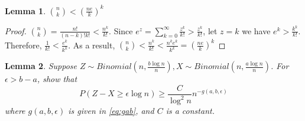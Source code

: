 \documentclass{article}
\newtheorem{lemma}{Lemma}
\begin{document}
\begin{lemma}\label{lem:nk}
	$\binom{n}{k} < (\frac{ne}{k})^k$
\end{lemma}
\begin{proof}
	$\binom{n}{k} = \frac{n!}{(n-k)!k!} < \frac{n^k}{k!}$.
	Since $e^z = \sum_{k=0}^{\infty} \frac{z^k}{k!} > \frac{z^k}{k!}$,
	let $z=k$ we have $e^k > \frac{k^k}{k!}$.
	Therefore, $\frac{1}{k!} < \frac{e^k}{k^k}$.
	As a result, $\binom{n}{k}  < \frac{n^k}{k!} < \frac{n^k e^k}{k^k}
	= (\frac{ne}{k})^k$
\end{proof}


\begin{lemma}\label{lem:lower_bound}
	Suppose $Z \sim Binomial(n, \frac{b\log n}{n}), X\sim Binomial(n, \frac{a\log n}{n})$.
	For $ \epsilon > b - a$, show that
	\begin{equation}
	P(Z - X \geq \epsilon \log n) \geq \frac{C}{\log^2 n}
	n^{-g(a, b, \epsilon)}
	\end{equation}
	where $g(a,b,\epsilon)$ is given in \eqref{eq:gab},
	and $C$ is a constant.
\end{lemma}
\end{document}
